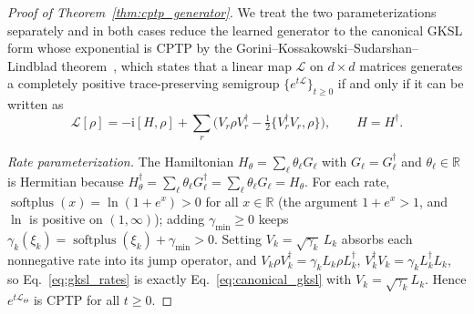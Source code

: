 \documentclass[twocolumn,aps,prxquantum,superscriptaddress,nofootinbib,floatfix,longbibliography]{revtex4-2}
\DeclareMathOperator{\softplus}{softplus}
\newcommand{\R}{\mathbb{R}}
\newcommand{\calL}{\mathcal{L}}
\newcommand{\ii}{\mathrm{i}}
\begin{document}
\begin{proof}[Proof of Theorem~\ref{thm:cptp_generator}]
We treat the two parameterizations separately and in both cases reduce the learned generator to the canonical GKSL form whose exponential is CPTP by the Gorini--Kossakowski--Sudarshan--Lindblad theorem~\cite{lindblad1976generators,gorini1976completely,breuer2002theory}, which states that a linear map $\calL$ on $d\times d$ matrices generates a completely positive trace-preserving semigroup $\{e^{t\calL}\}_{t\ge0}$ if and only if it can be written as
\begin{equation}
\calL[\rho]=-\ii[H,\rho]+\sum_{r}\Big(V_r\rho V_r^\dagger-\tfrac12\{V_r^\dagger V_r,\rho\}\Big),\qquad H=H^\dagger.
\label{eq:canonical_gksl}
\end{equation}

\emph{Rate parameterization.} The Hamiltonian $H_\theta=\sum_\ell\theta_\ell G_\ell$ with $G_\ell=G_\ell^\dagger$ and $\theta_\ell\in\R$ is Hermitian because $H_\theta^\dagger=\sum_\ell\theta_\ell G_\ell^\dagger=\sum_\ell\theta_\ell G_\ell=H_\theta$. For each rate, $\softplus(x)=\ln(1+e^x)>0$ for all $x\in\R$ (the argument $1+e^x>1$, and $\ln$ is positive on $(1,\infty)$); adding $\gamma_{\min}\ge0$ keeps $\gamma_k(\xi_k)=\softplus(\xi_k)+\gamma_{\min}>0$. Setting $V_k=\sqrt{\gamma_k}\,L_k$ absorbs each nonnegative rate into its jump operator, and $V_k\rho V_k^\dagger=\gamma_k L_k\rho L_k^\dagger$, $V_k^\dagger V_k=\gamma_k L_k^\dagger L_k$, so Eq.~\eqref{eq:gksl_rates} is exactly Eq.~\eqref{eq:canonical_gksl} with $V_k=\sqrt{\gamma_k}L_k$. Hence $e^{t\calL_\Theta}$ is CPTP for all $t\ge0$.


\end{proof}
\end{document}
